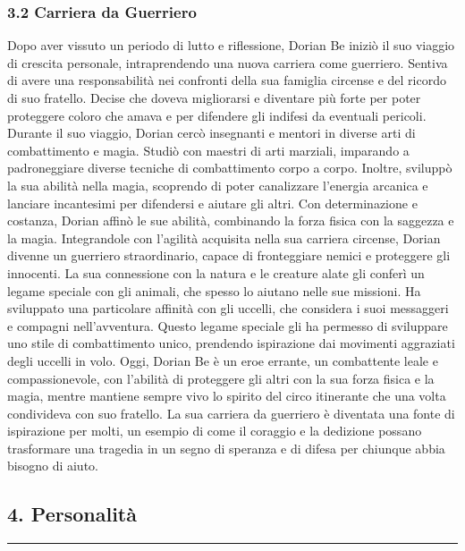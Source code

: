 \subsubsection{3.2 Carriera da Guerriero}\label{carriera-da-guerriero}

Dopo aver vissuto un periodo di lutto e riflessione, Dorian Be iniziò il
suo viaggio di crescita personale, intraprendendo una nuova carriera
come guerriero. Sentiva di avere una responsabilità nei confronti della
sua famiglia circense e del ricordo di suo fratello. Decise che doveva
migliorarsi e diventare più forte per poter proteggere coloro che amava
e per difendere gli indifesi da eventuali pericoli. Durante il suo
viaggio, Dorian cercò insegnanti e mentori in diverse arti di
combattimento e magia. Studiò con maestri di arti marziali, imparando a
padroneggiare diverse tecniche di combattimento corpo a corpo. Inoltre,
sviluppò la sua abilità nella magia, scoprendo di poter canalizzare
l'energia arcanica e lanciare incantesimi per difendersi e aiutare gli
altri. Con determinazione e costanza, Dorian affinò le sue abilità,
combinando la forza fisica con la saggezza e la magia. Integrandole con
l'agilità acquisita nella sua carriera circense, Dorian divenne un
guerriero straordinario, capace di fronteggiare nemici e proteggere gli
innocenti. La sua connessione con la natura e le creature alate gli
conferì un legame speciale con gli animali, che spesso lo aiutano nelle
sue missioni. Ha sviluppato una particolare affinità con gli uccelli,
che considera i suoi messaggeri e compagni nell'avventura. Questo legame
speciale gli ha permesso di sviluppare uno stile di combattimento unico,
prendendo ispirazione dai movimenti aggraziati degli uccelli in volo.
Oggi, Dorian Be è un eroe errante, un combattente leale e
compassionevole, con l'abilità di proteggere gli altri con la sua forza
fisica e la magia, mentre mantiene sempre vivo lo spirito del circo
itinerante che una volta condivideva con suo fratello. La sua carriera
da guerriero è diventata una fonte di ispirazione per molti, un esempio
di come il coraggio e la dedizione possano trasformare una tragedia in
un segno di speranza e di difesa per chiunque abbia bisogno di aiuto.

\subsection{4. Personalità}\label{personalituxe0}

\begin{center}\rule{0.5\linewidth}{0.5pt}\end{center}

